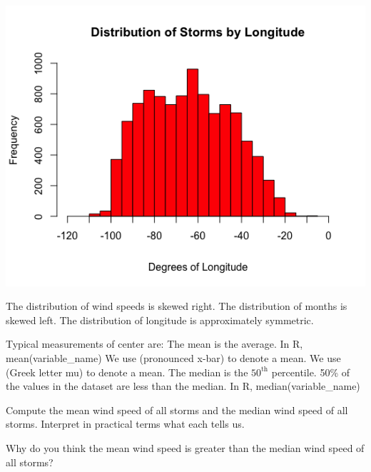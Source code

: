 \begin{center}
\includegraphics[width=0.3\tw]{02/fig-long-hist.png} 
\end{center}

\bi
\ii The distribution of wind speeds is \alert{skewed right}.
\ii The distribution of months is \alert{skewed left}.
\ii The distribution of longitude is approximately \alert{symmetric}.
\ei
\ebox



\bbox
Typical measurements of center are:
\bi
\ii The \alert{mean} is the average. In R, \alert{mean(variable\_name)}
\bi
\ii[$\circ$] We use  (pronounced x-bar) to denote a \textbf{} mean.
\ii[$\circ$] We use  (Greek letter mu) to denote a  \textbf{} mean.
\ei
\ii The \alert{median} is the $50^{\mbox{th}}$ percentile. 50\% of the values in the dataset are less than the median.  In R, \alert{median(variable\_name)}
\ei
\ebox

\bb[resume]
\ii Compute the mean wind speed of all storms and the median wind speed of all storms. Interpret in practical terms what each tells us. \vfill


\vfill

\ii Why do you think the mean wind speed is greater than the median wind speed of all storms? \vfill

